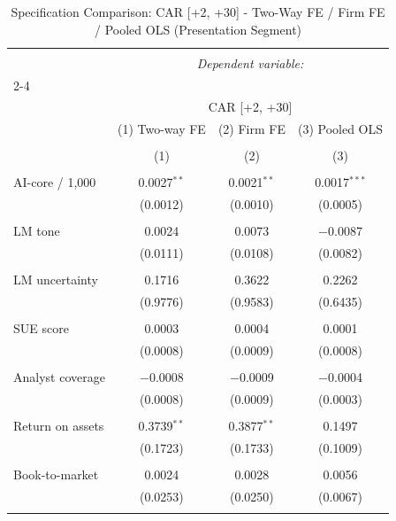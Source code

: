 
\begin{table}[!htbp] \centering 
  \caption{Specification Comparison: CAR [+2, +30] - Two-Way FE / Firm FE / Pooled OLS (Presentation Segment)} 
  \label{} 
\begin{tabular}{@{\extracolsep{5pt}}lccc} 
\\[-1.8ex]\hline 
\hline \\[-1.8ex] 
 & \multicolumn{3}{c}{\textit{Dependent variable:}} \\ 
\cline{2-4} 
\\[-1.8ex] & \multicolumn{3}{c}{CAR [+2, +30]} \\ 
 & (1) Two-way FE & (2) Firm FE & (3) Pooled OLS \\ 
\\[-1.8ex] & (1) & (2) & (3)\\ 
\hline \\[-1.8ex] 
 AI-core / 1,000 & 0.0027$^{**}$ & 0.0021$^{**}$ & 0.0017$^{***}$ \\ 
  & (0.0012) & (0.0010) & (0.0005) \\ 
  & & & \\ 
 LM tone & 0.0024 & 0.0073 & $-$0.0087 \\ 
  & (0.0111) & (0.0108) & (0.0082) \\ 
  & & & \\ 
 LM uncertainty & 0.1716 & 0.3622 & 0.2262 \\ 
  & (0.9776) & (0.9583) & (0.6435) \\ 
  & & & \\ 
 SUE score & 0.0003 & 0.0004 & 0.0001 \\ 
  & (0.0008) & (0.0009) & (0.0008) \\ 
  & & & \\ 
 Analyst coverage & $-$0.0008 & $-$0.0009 & $-$0.0004 \\ 
  & (0.0008) & (0.0009) & (0.0003) \\ 
  & & & \\ 
 Return on assets & 0.3739$^{**}$ & 0.3877$^{**}$ & 0.1497 \\ 
  & (0.1723) & (0.1733) & (0.1009) \\ 
  & & & \\ 
 Book-to-market & 0.0024 & 0.0028 & 0.0056 \\ 
  & (0.0253) & (0.0250) & (0.0067) \\ 
  & & & \\ 

\end{tabular}
\end{table}
